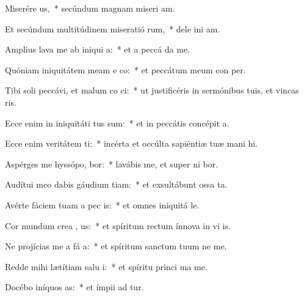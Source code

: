 \item Miserére  us,~* secúndum magnam miseri am.
\item Et secúndum multitúdinem miseratió rum,~* dele ini am.
\item Amplius lava me ab iniqui a:~* et a peccá  da me.
\item Quóniam iniquitátem meam e co:~* et peccátum meum con   per.
\item Tibi soli peccávi, et malum co  ci:~* ut justificéris in sermónibus tuis, et vincas  ris.
\item Ecce enim in iniquitáti tus sum:~* et in peccátis concépit   a.
\item Ecce enim veritátem ti:~* incérta et occúlta sapiéntiæ tuæ mani hi.
\item Aspérges me hyssópo,  bor:~* lavábis me, et super ni bor.
\item Audítui meo dabis gáudium  tiam:~* et exsultábunt ossa ta.
\item Avérte fáciem tuam a pec is:~* et omnes iniquitá  le.
\item Cor mundum crea  , us:~* et spíritum rectum ínnova in vi is.
\item Ne projícias me a fá a:~* et spíritum sanctum tuum ne   me.
\item Redde mihi lætítiam salu i:~* et spíritu princi ma me.
\item Docébo iníquos  as:~* et ímpii ad  tur.
